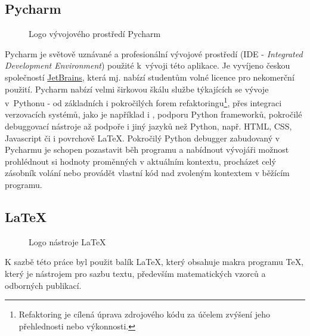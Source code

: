 \subsection{Pycharm}

\begin{figure}
	\centering
	
	\caption{Logo vývojového prostředí Pycharm}
\end{figure}

\begin{sloppypar}
	Pycharm je světově uznávané a profesionální vývojové prostředí (IDE - \emph{Integrated Development Environment}) použité k~vývoji této aplikace. Je vyvíjeno českou společností \href{https://www.jetbrains.com/}{JetBrains}, která mj. nabízí studentům volné licence pro nekomerční použití. Pycharm nabízí velmi širkovou škálu službe týkajících se vývoje v~Pythonu - od základních i pokročilých forem refaktoringu\footnote{Refaktoring je cílená úprava zdrojového kódu za účelem zvýšení jeho přehlednosti nebo výkonnosti.}, přes integraci verzovacích systémů, jako je například i , podporu Python frameworků, pokročilé debuggovací nástroje až podpoře i jiný jazyků než Python, např. HTML, CSS, Javascript či i povrchově \LaTeX{}. Pokročilý Python debugger zabudovaný v Pycharmu je schopen pozastavit běh programu a nabídnout vývojáři možnost prohlédnout si hodnoty proměnných v aktuálním kontextu, procházet celý zásobník volání nebo provádět vlastní kód nad zvoleným kontextem v běžícím programu.
\end{sloppypar}

\subsection{\LaTeX}

\begin{figure}
	\centering
	
	\caption{Logo nástroje \LaTeX}
\end{figure}

K sazbě této práce byl použit balík \LaTeX, který obsahuje makra programu \TeX, který je nástrojem pro sazbu textu, především matematických vzorců a odborných publikací.